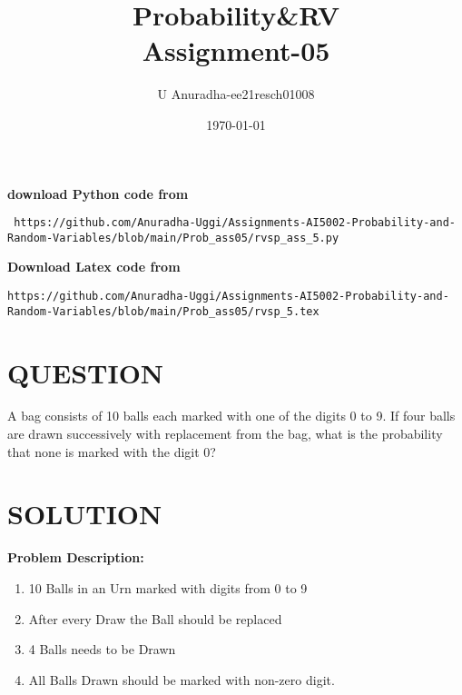 \documentclass[journal,12pt,twocolumn]{IEEEtran}
\title{Probability\&RV \\ Assignment-05}
\author{U Anuradha-ee21resch01008}
\date{\today}
\begin{document}
\maketitle
\newpage
\bigskip
\renewcommand{\thefigure}{\theenumi}
\renewcommand{\thetable}{\theenumi}
\textbf{download Python code from}
\begin{lstlisting}
 https://github.com/Anuradha-Uggi/Assignments-AI5002-Probability-and-Random-Variables/blob/main/Prob_ass05/rvsp_ass_5.py
\end{lstlisting}
\textbf{Download Latex code from}
\begin{lstlisting}
https://github.com/Anuradha-Uggi/Assignments-AI5002-Probability-and-Random-Variables/blob/main/Prob_ass05/rvsp_5.tex
\end{lstlisting}
\section{\textbf{QUESTION}}
A bag consists of 10 balls each marked with one of the digits 0 to 9. If four balls are drawn successively with replacement from the bag,
what is the probability that none is marked with the digit 0?
\section{\textbf{SOLUTION}}
\textbf{Problem  Description:}
\begin{enumerate}
    \item  10 Balls in an Urn  marked with  digits from 0 to 9\\
    \item After every Draw the Ball should be replaced  \\
    \item 4 Balls needs to be Drawn\\
    \item All Balls Drawn should be marked with non-zero digit.\\
\end{enumerate}
  
\end{document}
